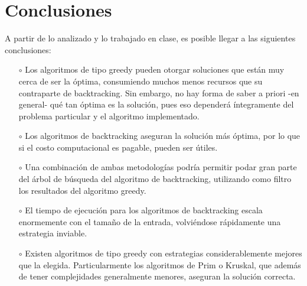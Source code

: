 \documentclass[10 pt, A4paper]{article}
\begin{document}
	\section*{Conclusiones}
	A partir de lo analizado y lo trabajado en clase, es posible llegar a las siguientes conclusiones:
	\begin{itemize}
		\item[$\circ$] Los algoritmos de tipo greedy pueden otorgar soluciones que están muy cerca de ser la óptima, consumiendo muchos menos recursos que su contraparte de backtracking. Sin embargo, no hay forma de saber a priori -en general- qué tan óptima es la solución, pues eso dependerá íntegramente del problema particular y el algoritmo implementado.
		\item[$\circ$] Los algoritmos de backtracking aseguran la solución más óptima, por lo que si el costo computacional es pagable, pueden ser útiles.
		\item[$\circ$] Una combinación de ambas metodologías podría permitir podar gran parte del árbol de búsqueda del algoritmo de backtracking, utilizando como filtro los resultados del algoritmo greedy.
		\item[$\circ$] El tiempo de ejecución para los algoritmos de backtracking escala enormemente con el tamaño de la entrada, volviéndose rápidamente una estrategia inviable.
		\item[$\circ$] Existen algoritmos de tipo greedy con estrategias considerablemente mejores que la elegida. Particularmente los algoritmos de Prim o Kruskal, que además de tener complejidades generalmente menores, aseguran la solución correcta.
	\end{itemize}
	
	
\end{document}

